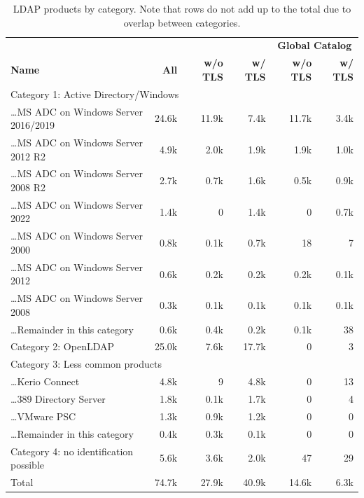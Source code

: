\begin{table}[tb]
\centering
\scriptsize
\caption{LDAP products by category. Note that rows do not add up to the total due to overlap between categories.}

\begin{tabular}{lrrrrr}
\toprule
&              &         &        & \multicolumn{2}{c}{\textbf{Global Catalog}} \\
\textbf{Name} & \textbf{All} & \textbf{w/o TLS} & \textbf{w/ TLS} & \textbf{w/o TLS} & \textbf{w/ TLS} \\
\midrule
\multicolumn{6}{l}{Category 1: Active Directory/Windows} \\
\ldots MS ADC on Windows Server 2016/2019 & 24.6k & 11.9k & 7.4k & 11.7k & 3.4k \\
\ldots MS ADC on Windows Server 2012 R2 & 4.9k & 2.0k & 1.9k & 1.9k & 1.0k \\
\ldots MS ADC on Windows Server 2008 R2 & 2.7k & 0.7k & 1.6k & 0.5k & 0.9k \\
\ldots MS ADC on Windows Server 2022 & 1.4k & 0 & 1.4k & 0 & 0.7k \\
\ldots MS ADC on Windows Server 2000 & 0.8k & 0.1k & 0.7k & 18 & 7 \\
\ldots MS ADC on Windows Server 2012 & 0.6k & 0.2k & 0.2k & 0.2k & 0.1k \\
\ldots MS ADC on Windows Server 2008 & 0.3k & 0.1k & 0.1k & 0.1k & 0.1k \\
\ldots Remainder in this category & 0.6k & 0.4k & 0.2k & 0.1k & 38 \\
\midrule
Category 2: OpenLDAP & 25.0k & 7.6k & 17.7k & 0 & 3 \\
\midrule
\multicolumn{6}{l}{Category 3: Less common products} \\
\ldots Kerio Connect & 4.8k & 9 & 4.8k & 0 & 13 \\
\ldots 389 Directory Server & 1.8k & 0.1k & 1.7k & 0 & 4 \\
\ldots VMware PSC & 1.3k & 0.9k & 1.2k & 0 & 0 \\
\ldots Remainder in this category & 0.4k & 0.3k & 0.1k & 0 & 0 \\
\midrule
Category 4: no identification possible & 5.6k & 3.6k & 2.0k & 47 & 29 \\
\midrule
Total & 74.7k & 27.9k & 40.9k & 14.6k & 6.3k \\
\bottomrule
\end{tabular}

\label{tab:ldap_types}
\vspace{-15px}
\end{table}


